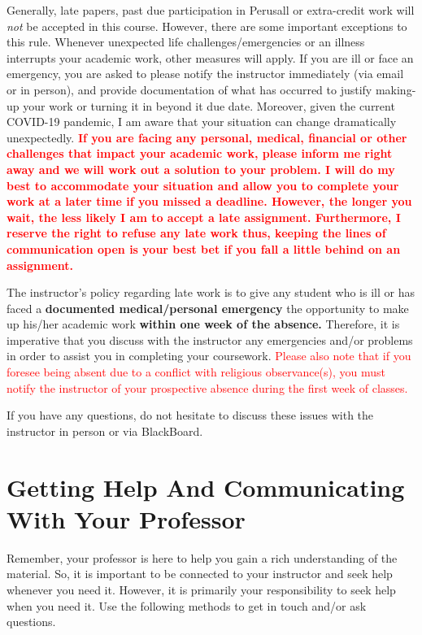\documentclass[11pt,]{article}
\begin{document}
Generally, late papers, past due participation in Perusall or
extra-credit work will \emph{not} be accepted in this course. However,
there are some important exceptions to this rule. Whenever unexpected
life challenges/emergencies or an illness interrupts your academic work,
other measures will apply. If you are ill or face an emergency, you are
asked to please notify the instructor immediately (via email or in
person), and provide documentation of what has occurred to justify
making-up your work or turning it in beyond it due date. Moreover, given
the current COVID-19 pandemic, I am aware that your situation can change
dramatically unexpectedly.
\textbf{\textcolor{red}{If you are facing any personal, medical, financial or other challenges that impact your academic work, please inform me right away and we will work out a solution to your problem. I will do my best to accommodate your situation and allow you to complete your work at a later time if you missed a deadline.}
\textcolor{red}{However, the longer you wait, the less likely I am to accept a late assignment. Furthermore, I reserve the right to refuse any late work thus, keeping the lines of communication open is your best bet if you fall a little behind on an assignment.}}

The instructor's policy regarding late work is to give any student who
is ill or has faced a \textbf{documented medical/personal emergency} the
opportunity to make up his/her academic work \textbf{within one week of
the absence.} Therefore, it is imperative that you discuss with the
instructor any emergencies and/or problems in order to assist you in
completing your coursework.
\textcolor{red}{Please also note that if you foresee being absent due to a conflict with religious observance(s), you must notify the instructor of your prospective absence during the first week of classes.}

If you have any questions, do not hesitate to discuss these issues with
the instructor in person or via BlackBoard.

\hypertarget{getting-help-and-communicating-with-your-professor}{%
\section{Getting Help And Communicating With Your
Professor}\label{getting-help-and-communicating-with-your-professor}}

Remember, your professor is here to help you gain a rich understanding
of the material. So, it is important to be connected to your instructor
and seek help whenever you need it. However, it is primarily your
responsibility to seek help when you need it. Use the following methods
to get in touch and/or ask questions.
\end{document}
